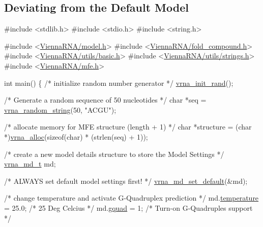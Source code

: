 \subsection*{Deviating from the Default Model }


\begin{DoxyCodeInclude}
\textcolor{preprocessor}{#include <stdlib.h>}
\textcolor{preprocessor}{#include <stdio.h>}
\textcolor{preprocessor}{#include <string.h>}

\textcolor{preprocessor}{#include <\hyperlink{model_8h}{ViennaRNA/model.h}>}
\textcolor{preprocessor}{#include <\hyperlink{fold__compound_8h}{ViennaRNA/fold\_compound.h}>}
\textcolor{preprocessor}{#include <\hyperlink{utils_2basic_8h}{ViennaRNA/utils/basic.h}>}
\textcolor{preprocessor}{#include <\hyperlink{strings_8h}{ViennaRNA/utils/strings.h}>}
\textcolor{preprocessor}{#include <\hyperlink{mfe_8h}{ViennaRNA/mfe.h}>}

\textcolor{keywordtype}{int}
main()
\{
  \textcolor{comment}{/* initialize random number generator */}
  \hyperlink{group__utils_ga0ad1f40ea316e5c5918695c35613027a}{vrna\_init\_rand}();

  \textcolor{comment}{/* Generate a random sequence of 50 nucleotides */}
  \textcolor{keywordtype}{char}      *seq = \hyperlink{group__string__utils_ga4eeb3750dcf860b9f3158249f95dbd7f}{vrna\_random\_string}(50, \textcolor{stringliteral}{"ACGU"});

  \textcolor{comment}{/* allocate memory for MFE structure (length + 1) */}
  \textcolor{keywordtype}{char}      *structure = (\textcolor{keywordtype}{char} *)\hyperlink{group__utils_gaf37a0979367c977edfb9da6614eebe99}{vrna\_alloc}(\textcolor{keyword}{sizeof}(\textcolor{keywordtype}{char}) * (strlen(seq) + 1));

  \textcolor{comment}{/* create a new model details structure to store the Model Settings */}
  \hyperlink{group__model__details_structvrna__md__s}{vrna\_md\_t} md;

  \textcolor{comment}{/* ALWAYS set default model settings first! */}
  \hyperlink{group__model__details_ga8ac6ff84936282436f822644bf841f66}{vrna\_md\_set\_default}(&md);

  \textcolor{comment}{/* change temperature and activate G-Quadruplex prediction */}
  md.\hyperlink{group__model__details_a5f7e5c2b65bada5188443470e576aa4b}{temperature}  = 25.0; \textcolor{comment}{/* 25 Deg Celcius */}
  md.\hyperlink{group__model__details_af88a511a2b1f526b4c6213de6cb8fd6e}{gquad}        = 1;    \textcolor{comment}{/* Turn-on G-Quadruples support */}


\end{DoxyCodeInclude}
